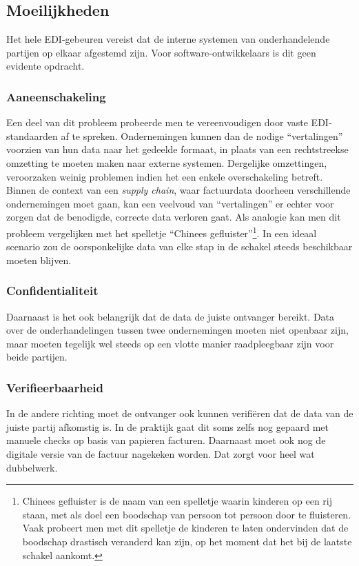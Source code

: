 \subsection{Moeilijkheden}

Het hele EDI-gebeuren vereist dat de interne systemen van onderhandelende partijen op elkaar afgestemd zijn. Voor software-ontwikkelaars is dit geen evidente opdracht. 

\subsubsection{Aaneenschakeling}
Een deel van dit probleem probeerde men te vereenvoudigen door vaste EDI-standaarden af te spreken. Ondernemingen kunnen dan de nodige ``vertalingen'' voorzien van hun data naar het gedeelde formaat, in plaats van een rechtstreekse omzetting te moeten maken naar externe systemen. Dergelijke omzettingen, veroorzaken weinig problemen indien het een enkele overschakeling betreft. Binnen de context van een \textit{supply chain}, waar factuurdata doorheen verschillende ondernemingen moet gaan, kan een veelvoud van ``vertalingen'' er echter voor zorgen dat de benodigde, correcte data verloren gaat. Als analogie kan men dit probleem vergelijken met het spelletje ``Chinees gefluister''\footnote{Chinees gefluister is de naam van een spelletje waarin kinderen op een rij staan, met als doel een boodschap van persoon tot persoon door te fluisteren. Vaak probeert men met dit spelletje de kinderen te laten ondervinden dat de boodschap drastisch veranderd kan zijn, op het moment dat het bij de laatste schakel aankomt.}. In een ideaal scenario zou de oorsponkelijke data van elke stap in de schakel steeds beschikbaar moeten blijven.


\subsubsection{Confidentialiteit}
Daarnaast is het ook belangrijk dat de data de juiste ontvanger bereikt. Data over de onderhandelingen tussen twee ondernemingen moeten niet openbaar zijn, maar moeten tegelijk wel steeds op een vlotte manier raadpleegbaar zijn voor beide partijen.

\subsubsection{Verifieerbaarheid}

In de andere richting moet de ontvanger ook kunnen verifiëren dat de data van de juiste partij afkomstig is. In de praktijk gaat dit soms zelfs nog gepaard met manuele checks op basis van papieren facturen. Daarnaast moet ook nog de digitale versie van de factuur nagekeken worden. Dat zorgt voor heel wat dubbelwerk. 


